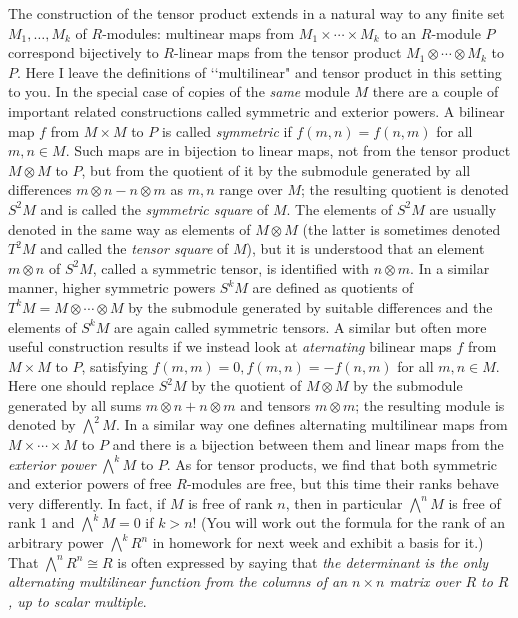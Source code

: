The construction of the tensor product extends in a natural way to any finite set $M_1,\ldots,M_k$ of
$R$-modules:  multinear maps from $M_1\times\cdots\times M_k$ to an $R$-module $P$ correspond bijectively to $R$-linear maps from the tensor product $M_1\otimes\cdots\otimes M_k$ to $P$.  Here I
leave the definitions of \lq\lq multilinear" and tensor product in this setting to you.  In the special case of copies of the {\sl same} module $M$ there are a couple of important related constructions called symmetric and exterior powers.  A bilinear map $f$ from $M\times M$ to $P$ is called {\sl symmetric} if $f(m,n) = f(n,m)$ for all $m,n\in M$.  Such maps are in bijection to linear maps, not from the tensor product $M\otimes M$ to $P$, but from the quotient of it by the submodule generated by all differences $m\otimes n - n\otimes m$ as $m,n$ range over $M$; the resulting quotient is denoted
$S^2 M$ and is called the {\sl symmetric square} of $M$.  The elements of $S^2 M$ are usually denoted in the same way as elements of $M\otimes M$ (the latter is sometimes denoted $T^2 M$ and called the {\sl tensor square} of $M$), but it is understood that an element $m\otimes n$ of $S^2 M$, called a symmetric tensor, is identified with $n\otimes m$.  In a similar manner, higher symmetric powers $S^k M$ are defined as quotients of $T^k M = M\otimes\cdots\otimes M$ by the submodule generated by suitable differences and the elements of $S^k M$ are again called symmetric tensors.  A similar but often more useful construction results if we instead look at {\sl aternating} bilinear maps $f$ from $M\times M$ to $P$, satisfying $f(m,m) = 0, f(m,n) = -f(n,m)$ for all $m,n\in M$.  Here one should replace $S^2 M$ by the quotient of $M\otimes M$ by the submodule generated by all sums
$m\otimes n + n\otimes m$ and tensors $m\otimes m$; the resulting module is denoted by
$\bigwedge^2 M$.  In a similar way one defines alternating multilinear maps from
$M\times\cdots\times M$ to $P$ and there is a bijection between them and linear maps from the
{\sl exterior power} $\bigwedge^k M$ to $P$.  As for tensor products, we find that both symmetric and exterior powers of free $R$-modules are free, but this time their ranks behave very differently.  In fact, if $M$ is free of rank $n$, then in particular $\bigwedge^n M$ is free of rank 1 and
$\bigwedge^k M = 0$ if $k>n$!  (You will work out the formula for the rank of an arbitrary power
$\bigwedge^k R^n$ in homework for next week and exhibit a basis for it.)  That $\bigwedge^n R^n\cong R$ is often expressed by saying that {\sl the determinant is the only alternating multilinear function from the columns of an $n\times n$ matrix over $R$ to $R$, up to scalar multiple}.  


